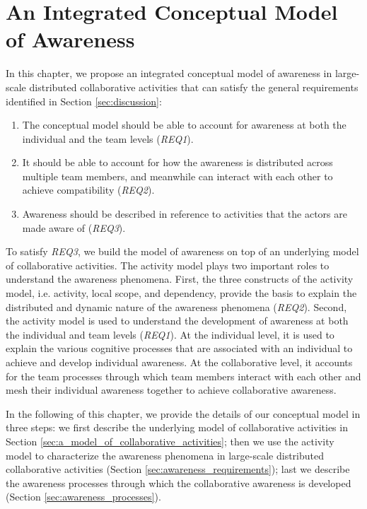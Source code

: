 \graphicspath{{Figures/}}

\chapter{An Integrated Conceptual Model of Awareness} %
\label{cha:the_conceptual_framework}
In this chapter, we propose an integrated conceptual model of awareness in large-scale distributed collaborative activities that can satisfy the general requirements identified in Section \ref{sec:discussion}:

\begin{enumerate}
	\item The conceptual model should be able to account for awareness at both the individual and the team levels (\emph{REQ1}).
	\item It should be able to account for how the awareness is distributed across multiple team members, and meanwhile can interact with each other to achieve compatibility (\emph{REQ2}). 
	\item Awareness should be described in reference to activities that the actors are made aware of (\emph{REQ3}).
\end{enumerate}

To satisfy \emph{REQ3}, we build the model of awareness on top of an underlying model of collaborative activities. The activity model plays two important roles to understand the awareness phenomena. First, the three constructs of the activity model, i.e. activity, local scope, and dependency, provide the basis to explain the distributed and dynamic nature of the awareness phenomena (\emph{REQ2}). Second, the activity model is used to understand the development of awareness at both the individual and team levels (\emph{REQ1}). At the individual level, it is used to explain the various cognitive processes that are associated with an individual to achieve and develop individual awareness. At the collaborative level, it accounts for the team processes through which team members interact with each other and mesh their individual awareness together to achieve collaborative awareness. 

In the following of this chapter, we provide the details of our conceptual model in three steps: we first describe the underlying model of collaborative activities in Section \ref{sec:a_model_of_collaborative_activities}; then we use the activity model to characterize the awareness phenomena in large-scale distributed collaborative activities (Section \ref{sec:awareness_requirements}); last we describe the awareness processes through which the collaborative awareness is developed (Section \ref{sec:awareness_processes}).

